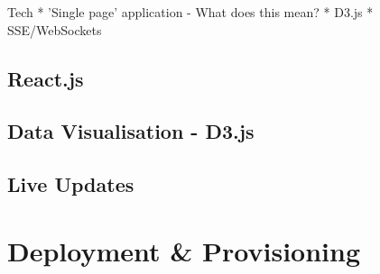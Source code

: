 \documentclass{cshonours}
\begin{document}

Tech
* 'Single page' application - What does this mean?
* D3.js
* SSE/WebSockets

\subsection{React.js}
\subsection{Data Visualisation - D3.js}
\subsection{Live Updates}

\pagebreak
\section{Deployment \& Provisioning}

\pagebreak
\end{document}
